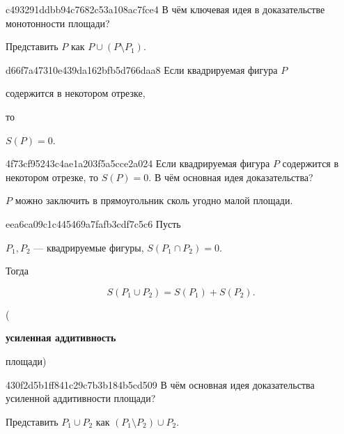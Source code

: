 \begin{note}{c493291ddbb94c7682c53a108ac7fce4}
    В чём ключевая идея в доказательстве монотонности площади?

    \begin{cloze}{1}
        Представить \({ P }\) как \({ P \cup (P \setminus P_1) }\).
   \end{cloze}
\end{note}

\begin{note}{d66f7a47310e439da162bfb5d766daa8}
    Если квадрируемая фигура \({ P }\) \begin{icloze}{2}содержится в некотором отрезке,\end{icloze} то \begin{icloze}{1}\({ S(P) = 0 }\).\end{icloze}
\end{note}

\begin{note}{4f73cf95243c4ae1a203f5a5cce2a024}
    Если квадрируемая фигура \({ P }\) содержится в некотором отрезке, то \({ S(P) = 0 }\).
    В чём основная идея доказательства?

    \begin{cloze}{1}
        \({ P }\) можно заключить в прямоугольник сколь угодно малой площади.
    \end{cloze}
\end{note}

\begin{note}{eea6ca09c1c445469a7fafb3cdf7c5c6}
    Пусть \begin{icloze}{1}\({ P_1, P_2 }\) --- квадрируемые фигуры, \({ S(P_1 \cap P_2) = 0 }\).\end{icloze}
    Тогда
    \begin{icloze}{2}
        \[
            S(P_1 \cup P_2) = S(P_1) + S(P_2).
        \]
    \end{icloze}

    \begin{center}
        \tiny
        (\begin{icloze}{3}\textbf{усиленная аддитивность}\end{icloze} площади)
    \end{center}
\end{note}

\begin{note}{430f2d5b1ff841c29c7b3b184b5cd509}
    В чём основная идея доказательства усиленной аддитивности площади?

    \begin{cloze}{1}
        Представить \({ P_1 \cup P_2 }\) как \({ (P_1 \setminus P_2) \cup P_2 }\).
    \end{cloze}
\end{note}

